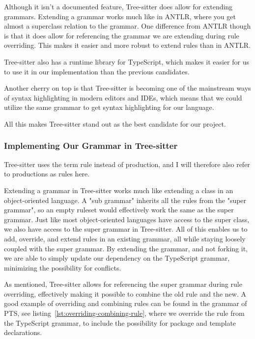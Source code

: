 Although it isn't a documented feature, Tree-sitter does allow for extending grammars.
Extending a grammar works much like in ANTLR, where you get almost a superclass relation to the grammar.
One difference from ANTLR though is that it does allow for referencing the grammar we are extending during rule overriding.
This makes it easier and more robust to extend rules than in ANTLR.

Tree-sitter also has a runtime library for TypeScript, which makes it easier for us to use it in our implementation than the previous candidates.

Another cherry on top is that Tree-sitter is becoming one of the mainstream ways of syntax highlighting in modern editors and IDEs, which means that we could utilize the same grammar to get syntax highlighting for our language.

All this makes Tree-sitter stand out as the best candidate for our project.

\subsubsection{Implementing Our Grammar in Tree-sitter}

Tree-sitter uses the term rule instead of production, and I will therefore also refer to productions as rules here.

Extending a grammar in Tree-sitter works much like extending a class in an object-oriented language.
A "sub grammar" inherits all the rules from the "super grammar", so an empty ruleset would effectively work the same as the super grammar.
Just like most object-oriented languages have access to the super class, we also have access to the super grammar in Tree-sitter.
All of this enables us to add, override, and extend rules in an existing grammar, all while staying loosely coupled with the super grammar.
By extending the grammar, and not forking it, we are able to simply update our dependency on the TypeScript grammar, minimizing the possibility for conflicts.

As mentioned, Tree-sitter allows for referencing the super grammar during rule overriding, effectively making it possible to combine the old rule and the new.
A good example of overriding and combining rules can be found in the grammar of PTS, see listing~\vref{lst:overriding-combining-rule}, where we override the  rule from the TypeScript grammar, to include the possibility for package and template declarations.

